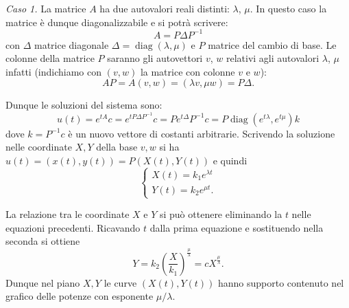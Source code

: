 \documentclass[italian,a4paper]{scrartcl}
\DeclareMathOperator{\diag}{diag}
\begin{document}
\emph{Caso 1.} 
La matrice $A$ ha due autovalori reali distinti: $\lambda$, $\mu$.
In questo caso la matrice è dunque diagonalizzabile e si potrà scrivere:
\[
  A = P \Delta P^{-1}
\]
con $\Delta$ matrice diagonale $\Delta = \diag(\lambda,\mu)$
 e $P$ matrice del cambio di base. Le colonne
della matrice $P$ saranno gli autovettori $v$, $w$ relativi agli
autovalori $\lambda$, $\mu$ infatti (indichiamo con $(v,w)$ la matrice con colonne $v$ e $w$):
\[
  A P = A (v, w) = (\lambda v, \mu w) = P \Delta.
\]

Dunque le soluzioni del sistema sono:
\[
  u(t) = e^{tA}c = e^{tP\Delta P^{-1}}c = P e^{t\Delta} P^{-1}c
  = P \diag(e^{t \lambda},e^{t \mu}) k
\]
dove $k=P^{-1}c$ è un nuovo vettore di costanti
arbitrarie. Scrivendo la soluzione nelle coordinate $X,Y$ della base $v,w$ si ha $u(t) = (x(t),y(t)) = P(X(t),Y(t))$ 
e quindi
\[
\begin{cases}
X(t) = k_1 e^{\lambda t} \\
Y(t) = k_2 e^{\mu t}.
\end{cases}
\]

La relazione tra le coordinate $X$ e $Y$ si può ottenere eliminando la
$t$ nelle equazioni precedenti. Ricavando $t$ dalla prima equazione e
sostituendo nella seconda si ottiene
\[
Y = k_2 \left(\frac{X}{k_1}\right)^{\frac{\mu}{\lambda}}
  = c X^{\frac \mu \lambda}.
\]
Dunque nel piano $X,Y$ le curve $(X(t),Y(t))$ hanno supporto contenuto
nel grafico delle potenze con esponente $\mu/\lambda$.
\end{document}
